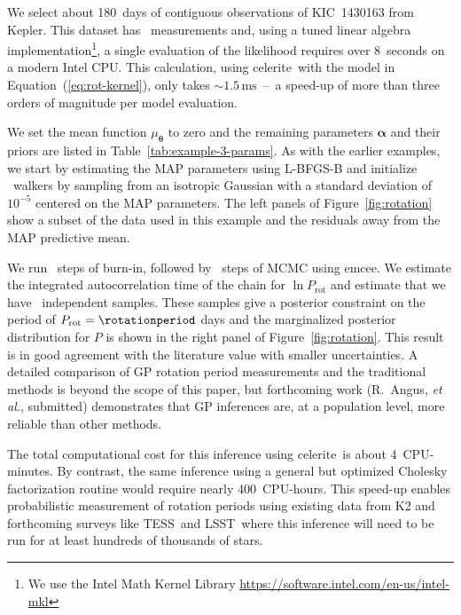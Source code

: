 \documentclass[manuscript, letterpaper]{aastex6}
\newcommand{\project}[1]{\textsf{#1}}
\newcommand{\kepler}{\project{Kepler}}
\newcommand{\lsst}{\project{LSST}}
\newcommand{\tess}{\project{TESS}}
\newcommand{\celerite}{\project{celerite}}
\newcommand{\emcee}{\project{emcee}}
\newcommand{\foreign}[1]{\emph{#1}}
\newcommand{\etal}{\foreign{et\,al.}}
\newcommand{\figureref}[1]{\ref{fig:#1}}
\newcommand{\Figure}[1]{Figure~\figureref{#1}}
\renewcommand{\eqref}[1]{\ref{eq:#1}}
\newcommand{\Eq}[1]{Equation~(\eqref{#1})}
\newcommand{\eq}[1]{\Eq{#1}}
\newcommand{\bvec}[1]{{\ensuremath{\boldsymbol{#1}}}}
\newcommand{\response}[1]{{\color{blue}#1}}
\begin{document}
\response{We select about 180~days of contiguous observations of
KIC~1430163 from \kepler.
This dataset has \exampleiiindata\ measurements and, using a tuned linear
algebra
implementation\footnote{We use the Intel Math Kernel Library
\url{https://software.intel.com/en-us/intel-mkl}}, a
single evaluation of the likelihood requires over 8~seconds on a modern Intel
CPU.
This calculation, using \celerite\ with the model in \eq{rot-kernel}, only
takes $\sim 1.5\,\mathrm{ms}$~--~a speed-up of more than three orders of
magnitude per model evaluation. %

We set the mean function $\mu_\bvec{\theta}$ to zero and the remaining
parameters $\bvec{\alpha}$ and their priors are listed in
Table~\ref{tab:example-3-params}.
As with the earlier examples, we start by estimating the MAP parameters using
\project{L-BFGS-B} and initialize \exampleiiinwalkers~walkers by sampling from
an isotropic Gaussian with a standard deviation of $10^{-5}$ centered on the
MAP parameters.
The left panels of \Figure{rotation} show a subset of the data used in this
example and the residuals away from the MAP predictive mean.

We run \exampleiiinburn~steps of burn-in, followed by \exampleiiinsteps~steps
of MCMC using \emcee.
We estimate the integrated autocorrelation time of the chain for $\ln
P_\mathrm{rot}$ and estimate that we have \exampleiiineff\ independent
samples.
These samples give a posterior constraint on the period of $P_\mathrm{rot} =
\rotationperiod$ days and the marginalized posterior distribution for $P$ is
shown in the right panel of \Figure{rotation}.
This result is in good agreement with the literature value with smaller
uncertainties.
A detailed comparison of GP rotation period measurements and the traditional
methods is beyond the scope of this paper, but forthcoming work (R.~Angus,
\etal, submitted) demonstrates that GP inferences are, at a population level,
more reliable than other methods.

The total computational cost for this inference using \celerite\ is about
4~CPU-minutes.
By contrast, the same inference using a general but optimized Cholesky
factorization routine would require nearly 400~CPU-hours.
This speed-up enables probabilistic measurement of rotation periods using
existing data from \project{K2} and forthcoming surveys like \tess\ and \lsst\
where this inference will need to be run for at least hundreds of thousands of
stars.
}


\end{document}
